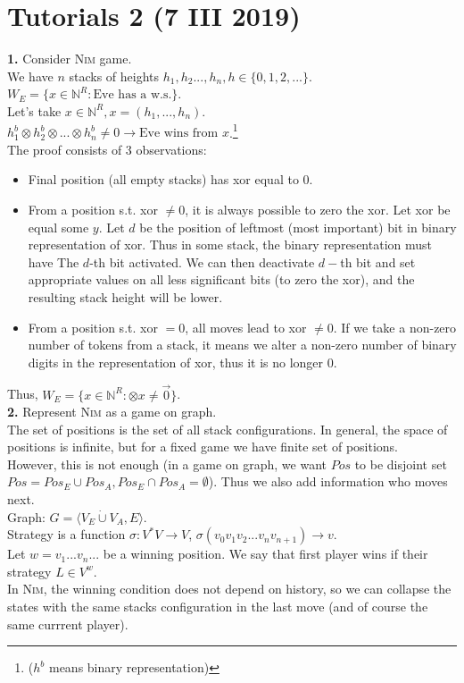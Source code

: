 \section{Tutorials 2 (7 III 2019)}
\noindent
\textbf{1.} Consider \textsc{Nim} game.\\
We have $n$ stacks of heights $h_1, h_2 ..., h_n, h \in \{0, 1, 2, ...\}$.\\
$W_E = \{x \in \mathbb{N}^R : \text{Eve has a w.s.}\}$.\\
Let's take $x \in \mathbb{N}^R, x = (h_1, ..., h_n)$.\\
$h_1^b \otimes h_2^b \otimes ... \otimes h_n^b \neq 0 \rightarrow \text{Eve wins from } x$.\footnote{($h^b$ means binary representation)}\\
The proof consists of 3 observations:
\begin{itemize}
	\item Final position (all empty stacks) has xor equal to 0.
	\item From a position s.t. xor $\neq 0$, it is always possible to zero the xor.
	Let xor be equal some $y$. Let $d$ be the position of leftmost (most important)
	bit in binary representation of xor. Thus in some stack, the binary representation
	must have The $d$-th bit activated. We can then deactivate $d-$th bit and set
	appropriate values on all less significant bits (to zero the xor), and the resulting
	stack height will be lower.
	\item From a position s.t. xor $= 0$, all moves lead to xor $\neq 0$. If we take
	a non-zero number of tokens from a stack, it means we alter a non-zero number of
	binary digits in the representation of xor, thus it is no longer 0.
\end{itemize}
Thus, $W_E = \{x \in \mathbb{N}^R : \otimes x \neq \vec{0}\}$.\\

\noindent
\textbf{2.} Represent \textsc{Nim} as a game on graph.\\
The set of positions is the set of all stack configurations. In general, the space of positions is infinite,
but for a fixed game we have finite set of positions.\\
However, this is not enough (in a game on graph, we want $Pos$ to be disjoint set $Pos = Pos_E \cup Pos_A, Pos_E \cap Pos_A = \emptyset$).
Thus we also add information who moves next.\\
Graph: $G = \langle V_E \dot\cup V_A, E \rangle$.\\
Strategy is a function $\sigma : V^*V \rightarrow V$, $\sigma(v_0v_1v_2...v_nv_{n+1}) \rightarrow v$.\\
Let $w = v_1...v_n...$ be a winning position. We say that first player wins if their strategy $L \in V^{w}$.\\
In \textsc{Nim}, the winning condition does not depend on history, so we can collapse the states with the same stacks configuration in the last move
(and of course the same currrent player).\\

